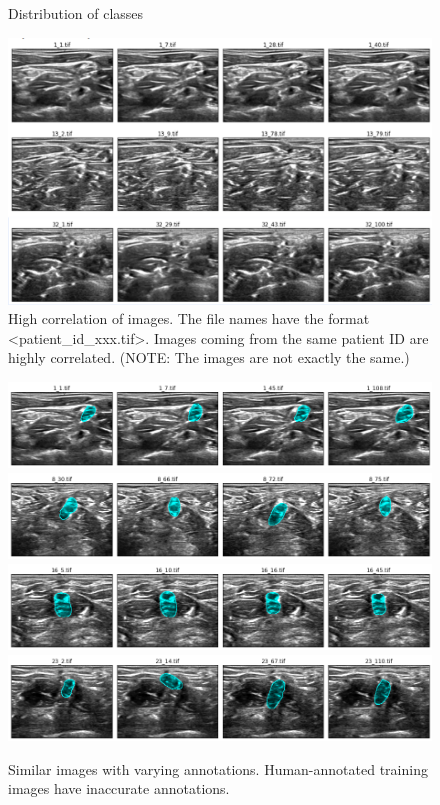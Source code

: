 \documentclass{article}
\begin{document}
\begin{figure}[h]
    \caption{Distribution of classes}
    \label{fig:distribution}
\end{figure}

\begin{figure}[ht]
 \centering
  \includegraphics[width=0.8\linewidth]{figures/high_corr.png}
  \caption{
      High correlation of images. The file names have the format \textless patient\_id\_xxx.tif\textgreater . Images coming from the same patient ID are highly correlated. (NOTE: The images are not exactly the same.)
  }
  \label{fig:high_corr}
\end{figure}

\begin{figure}[ht]
 \centering
  \includegraphics[width=0.8\linewidth]{figures/inaccurate_1.png}
  \includegraphics[width=0.8\linewidth]{figures/inaccurate_2.png}
  \includegraphics[width=0.8\linewidth]{figures/inaccurate_3.png}
  \includegraphics[width=0.8\linewidth]{figures/inaccurate_4.png}
  \caption{
      Similar images with varying annotations. Human-annotated training images have inaccurate annotations.
  }
  \label{fig:inaccurate}
\end{figure}
\end{document}
